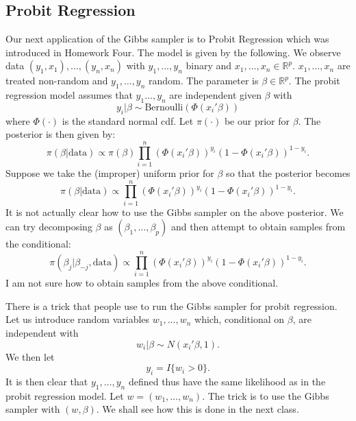 \documentclass{scrartcl}
\newcommand{\R}{{\mathbb R}}
\begin{document}
\subsection{Probit Regression}
Our next application of the Gibbs sampler is to Probit
Regression which was introduced in Homework Four. The model is given by
the following. We observe data $(y_1, x_1), \dots, (y_n, x_n)$ with 
  $y_1, \dots, y_n$ binary and $x_1, \dots, x_n \in \R^p$. $x_1,
  \dots, x_n$ are treated non-random and $y_1, \dots, y_n$ random. The 
  parameter is $\beta \in \R^p$. The probit regression model assumes
  that $y_1 \dots, y_n$ are independent given $\beta$ with
  \begin{equation*}
    y_i | \beta \sim \text{Bernoulli} \left(\Phi(x_i' \beta) \right)
  \end{equation*}
  where $\Phi(\cdot)$ is the standard normal cdf. Let $\pi(\cdot)$ be
  our prior for $\beta$. The posterior is then given by:
  \begin{equation*}
    \pi(\beta | \text{data}) \propto \pi(\beta) \prod_{i=1}^n
    \left(\Phi(x_i' \beta) \right)^{y_i} \left(1 - \Phi(x_i' \beta)
    \right)^{1-y_i}. 
  \end{equation*}
  Suppose we take the (improper) uniform prior for $\beta$ so that
  the posterior becomes
  \begin{equation*}
    \pi(\beta | \text{data}) \propto \prod_{i=1}^n
    \left(\Phi(x_i' \beta) \right)^{y_i} \left(1 - \Phi(x_i' \beta)
    \right)^{1-y_i}. 
  \end{equation*}
  It is not actually clear how to use the Gibbs sampler on the above
  posterior. We can try decomposing $\beta$ as $(\beta_1, \dots,
  \beta_p)$ and then attempt to obtain samples from the conditional:
  \begin{equation*}
    \pi(\beta_j | \beta_{-j}, \text{data}) \propto \prod_{i=1}^n
    \left(\Phi(x_i' \beta) \right)^{y_i} \left(1 - \Phi(x_i' \beta)
    \right)^{1-y_i}. 
  \end{equation*}
  I am not sure how to obtain samples from the above conditional.

  There is a trick that people use to run the Gibbs sampler for probit
  regression. Let us introduce random variables $w_1, \dots, w_n$
  which, conditional on $\beta$, are independent with
  \begin{equation*}
   w_i | \beta \sim N(x_i' \beta, 1). 
  \end{equation*}
  We then let
  \begin{equation*}
    y_i = I\{w_i > 0\}. 
  \end{equation*}
  It is then clear that $y_1, \dots, y_n$ defined thus have the same
  likelihood as in the probit regression model. Let $w = (w_1, \dots,
  w_n)$. The trick is to use the Gibbs sampler with $(w, \beta)$. We shall see how this is done in the next class. 
\end{document}
